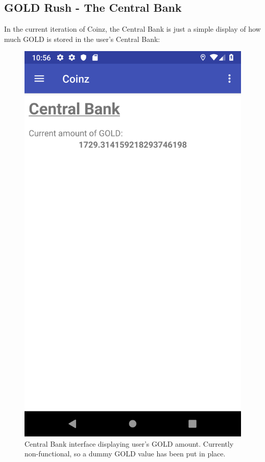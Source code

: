 \documentclass[11pt,a4paper,notitlepage]{article}
\begin{document}
\subsection{GOLD Rush - The Central Bank}

    In the current iteration of Coinz, the Central Bank is just a simple display of how much GOLD is stored in the user's Central Bank:

\begin{figure}[H]
    \centering
    \includegraphics[scale=0.25]{screenshots/central-bank/central-bank-view.png}
    \caption{Central Bank interface displaying user's GOLD amount. Currently non-functional, so a dummy GOLD value has been put in place.}
\end{figure}
\end{document}
